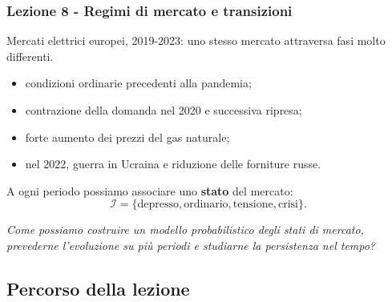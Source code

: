 \documentclass[handout]{beamer}%
\newenvironment{stepitemize}{\begin{itemize}[<+->]}{\end{itemize} }
\providecommand{\QTR}[2]{\csname #1\endcsname{#2}}
\begin{document}
\begin{frame}%
%

\frametitle{Lezione 8 - Regimi di mercato e transizioni}%
%

%


Mercati elettrici europei, 2019-2023: uno stesso mercato attraversa fasi molto differenti.

\medskip

\begin{stepitemize}
\item condizioni ordinarie precedenti alla pandemia;

\item contrazione della domanda nel 2020 e successiva ripresa;

\item forte aumento dei prezzi del gas naturale;

\item nel 2022, guerra in Ucraina e riduzione delle forniture russe.
\end{stepitemize}

\medskip

A ogni periodo possiamo associare uno \textbf{stato} del mercato:
\[
\mathcal{I} = \{ \text{depresso}, \text{ordinario}, \text{tensione},
\text{crisi} \}.
\]


\medskip

\begin{center}
{\small \emph{Come possiamo costruire un modello probabilistico degli stati di
mercato, prevederne l'evoluzione su pi\`{u} periodi e studiarne la persistenza
nel tempo?}}
\end{center}%

\transboxout
\end{frame}%






\subsection{Percorso della lezione}%
\end{document}
